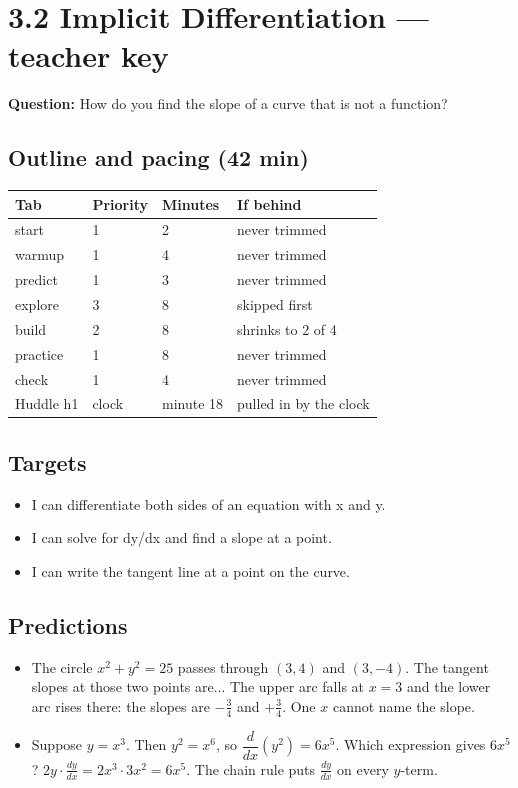 \documentclass[11pt]{article}
\begin{document}
\section*{3.2 Implicit Differentiation --- teacher key}
\textbf{Question:} How do you find the slope of a curve that is not a function?\par
\subsection*{Outline and pacing (42 min)}\begin{tabular}{@{}llll@{}}\toprule Tab & Priority & Minutes & If behind\\\midrule
start & 1 & 2 & never trimmed\\
warmup & 1 & 4 & never trimmed\\
predict & 1 & 3 & never trimmed\\
explore & 3 & 8 & skipped first\\
build & 2 & 8 & shrinks to 2 of 4\\
practice & 1 & 8 & never trimmed\\
check & 1 & 4 & never trimmed\\
Huddle h1 & clock & minute 18 & pulled in by the clock\\
\bottomrule\end{tabular}
\subsection*{Targets}\begin{itemize}\item I can differentiate both sides of an equation with x and y.
\item I can solve for dy/dx and find a slope at a point.
\item I can write the tangent line at a point on the curve.\end{itemize}
\subsection*{Predictions}\begin{itemize}
\item The circle $x^2+y^2=25$ passes through $(3,4)$ and $(3,-4)$. The tangent slopes at those two points are...  The upper arc falls at $x=3$ and the lower arc rises there: the slopes are $-\tfrac34$ and $+\tfrac34$. One $x$ cannot name the slope.
\item Suppose $y=x^3$. Then $y^2=x^6$, so $\dfrac{d}{dx}(y^2)=6x^5$. Which expression gives $6x^5$?  $2y\cdot\frac{dy}{dx}=2x^3\cdot3x^2=6x^5$. The chain rule puts $\frac{dy}{dx}$ on every $y$-term.
\end{itemize}
\end{document}
